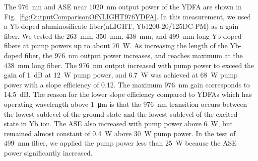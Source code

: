 \documentclass{osa-article}
\begin{document}
The \SI{976}{\nm} and ASE near \SI{1020}{\nm} output power of the YDFA are shown in Fig.~\ref{fig:OutputComparisonOfNLIGHT976YDFA}.
In this measurement, we used a Yb-doped aluminosilicate fiber(nLIGHT, Yb1200-20/125DC-PM) as a gain fiber.
We tested the \SI{263}{\mm}, \SI{350}{\mm}, \SI{438}{\mm}, and \SI{499}{\mm} long Yb-doped fibers at pump powers up to about \SI{70}{\W}.
As increasing the length of the Yb-doped fiber, the \SI{976}{\nm} output power increases, and reaches maximum at the \SI{438}{\mm} long fiber.
The \SI{976}{\nm} output increased with pump power to exceed the gain of \SI{1}{\dB} at \SI{12}{\W} pump power, and \SI{6.7}{\W} was achieved at \SI{68}{\W} pump power with a slope efficiency of 0.12.
The maximum \SI{976}{\nm} gain corresponds to \SI{14.5}{\dB}.
The reason for the lower slope efficiency compared to YDFAs which has operating wavelength above \SI{1}{\um} is that the \SI{976}{nm} transition occurs between the lowest sublevel of the ground state and the lowest sublevel of the excited state in Yb ion.
The ASE also increased with pump power above \SI{6}{\W}, but remained almost constant of \SI{0.4}{\W} above \SI{30}{\W} pump power.
In the test of \SI{499}{\mm} fiber, we applied the pump power less than \SI{25}{\W} because the ASE power significantly increased.
\end{document}
